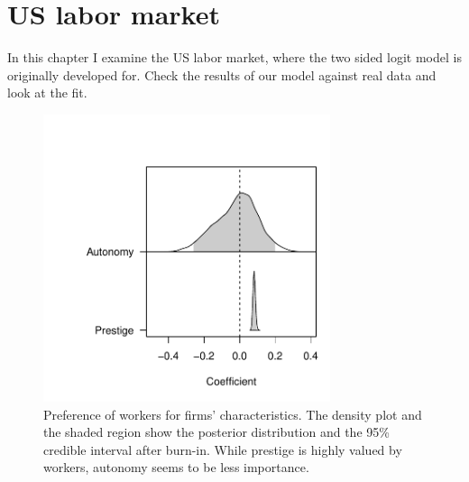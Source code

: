\chapter{US labor market}
\label{chap:labor}

In this chapter I examine the US labor market, where the two sided logit model is
originally developed for. Check the results of our model against real data and
look at the fit.

\begin{figure}[!ht]
  \centering
  \includegraphics[width=0.75\textwidth,keepaspectratio]{../figure/labor_occ5_alpha}
  \caption[Workers' preference in the US labor market.]{Preference of workers for firms' characteristics. The density plot and the
    shaded region show the posterior distribution and the 95\% credible interval
    after burn-in. While prestige is highly valued by workers, autonomy seems to
    be less importance.}
  \label{fig:labor_occ5_alpha}
\end{figure}

